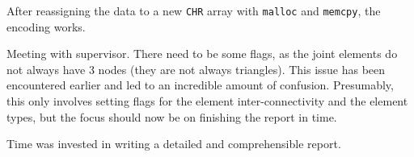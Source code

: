 \bigbreak
After reassigning the data to a new \texttt{CHR} array with \texttt{malloc} and \texttt{memcpy}, the encoding works.

\bigbreak
{}
Meeting with supervisor. There need to be some flags, as the joint elements do not always have 3 nodes (they are not always triangles). This issue has been encountered earlier and led to an incredible amount of confusion. Presumably, this only involves setting flags for the element inter-connectivity and the element types, but the focus should now be on finishing the report in time.

\bigbreak
{} Time was invested in writing a detailed and comprehensible report.
